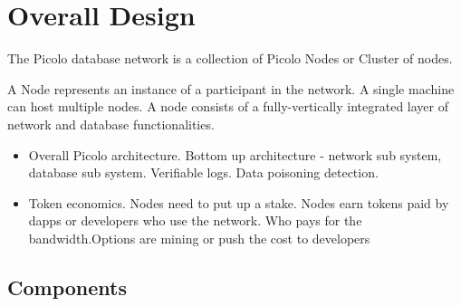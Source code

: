 \section{Overall Design}

The Picolo database network is a collection of Picolo Nodes or Cluster of nodes.

A Node represents an instance of a participant in the network. A single machine
can host multiple nodes. A node consists of a fully-vertically integrated layer of network and database functionalities.

    \begin{itemize}
        \item Overall Picolo architecture.
        	Bottom up architecture - network sub system, database sub system. Verifiable logs. Data poisoning detection.
        \item Token economics.
        	Nodes need to put up a stake. Nodes earn tokens paid by dapps or developers who use the network. Who pays for the bandwidth.Options are mining or push the cost to developers
    \end{itemize}
\subsection{Components}

